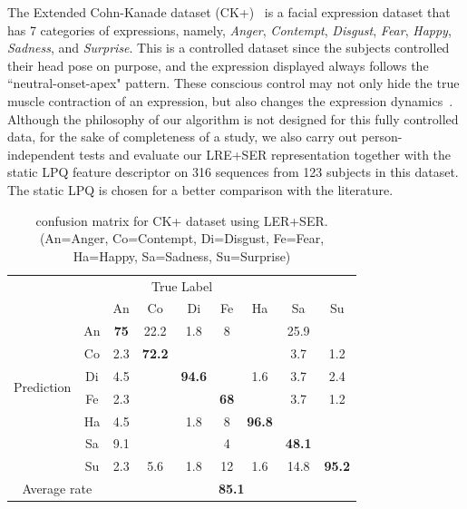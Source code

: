 \documentclass[journal]{IEEEtran}
\begin{document}
The Extended Cohn-Kanade dataset (CK+)~\cite{CKplus} is a facial expression dataset that has 7 categories of expressions, namely, \textit{Anger}, \textit{Contempt}, \textit{Disgust}, \textit{Fear}, \textit{Happy}, \textit{Sadness}, and \textit{Surprise}. This is a controlled dataset since the subjects controlled their head pose on purpose, and the expression displayed always follows the ``neutral-onset-apex" pattern. These conscious control may not only hide the true muscle contraction of an expression, but also changes the expression dynamics~\cite{Bartlett03}\cite{Ekman2005}. Although the philosophy of our algorithm is not designed for this fully controlled data, for the sake of completeness of a study, we also carry out person-independent tests and evaluate our LRE+SER representation together with the static LPQ feature descriptor on 316 sequences from 123 subjects in this dataset. The static LPQ is chosen for a better comparison with the literature. 

\begin{table}[htbp]
\caption{confusion matrix for CK+ dataset using LER+SER.
(An=Anger, Co=Contempt, Di=Disgust, Fe=Fear, Ha=Happy, Sa=Sadness, Su=Surprise)}
\begin{center}
\label{table:CK_result}
\begin{tabular}{c|c|ccccccc}

\multicolumn{9}{c}{True Label} \\ \cline{2-9}
\multirow{8}{*}{\begin{sideways}Prediction\end{sideways}} && An & Co & Di & Fe & Ha & Sa & Su \\ \cline{2-9}
&An          &\textbf{75} &22.2  &1.8  &8  &  &25.9 &  \\ \cline{2-2}
&Co       &2.3  &\textbf{72.2}  &   &   &  &3.7  &1.2 \\ \cline{2-2}
&Di        &4.5  &   &\textbf{94.6} &  &1.6 &3.7 &2.4  \\ \cline{2-2}
&Fe           &2.3   &   &   &\textbf{68} &  &3.7  &1.2  \\ \cline{2-2}
&Ha          &4.5   &   &1.8  &8 &\textbf{96.8} &  &  \\ \cline{2-2}
&Sa        &9.1  &  &  &4   &  &\textbf{48.1} & \\ \cline{2-2}
&Su       &2.3  &5.6 &1.8  &12 &1.6  &14.8 &\textbf{95.2} \\ \hline
\multicolumn{2}{c|}{Average rate} &\multicolumn{7}{c}{\textbf{85.1}} \\

\end{tabular}
\end{center}
\end{table}
\end{document}
